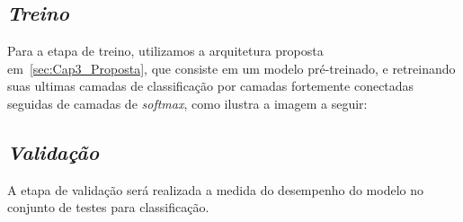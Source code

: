 \subsection{\textit{Treino}}\label{sec:Cap3_Treino}
Para a etapa de treino, utilizamos a arquitetura proposta em~\ref{sec:Cap3_Proposta}, que consiste em um modelo pré-treinado, e retreinando suas ultimas camadas de classificação por camadas fortemente conectadas seguidas de camadas de \textit{softmax}, como ilustra a imagem a seguir:





\subsection{\textit{Validação}}\label{sec:Cap3_Validacao}

A etapa de validação será realizada a medida do desempenho do modelo no conjunto de testes para classificação.



